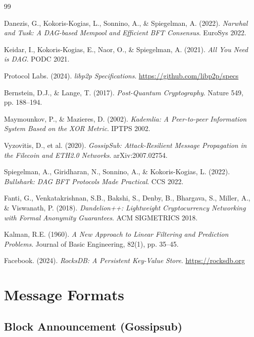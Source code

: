 \documentclass[11pt,a4paper]{article}
\begin{document}
\begin{thebibliography}{99}

Danezis, G., Kokoris-Kogias, L., Sonnino, A., \& Spiegelman, A. (2022).
\textit{Narwhal and Tusk: A DAG-based Mempool and Efficient BFT Consensus}.
EuroSys 2022.

Keidar, I., Kokoris-Kogias, E., Naor, O., \& Spiegelman, A. (2021).
\textit{All You Need is DAG}.
PODC 2021.

Protocol Labs. (2024).
\textit{libp2p Specifications}.
\url{https://github.com/libp2p/specs}

Bernstein, D.J., \& Lange, T. (2017).
\textit{Post-Quantum Cryptography}.
Nature 549, pp. 188--194.

Maymounkov, P., \& Mazieres, D. (2002).
\textit{Kademlia: A Peer-to-peer Information System Based on the XOR Metric}.
IPTPS 2002.

Vyzovitis, D., et al. (2020).
\textit{GossipSub: Attack-Resilient Message Propagation in the Filecoin and ETH2.0 Networks}.
arXiv:2007.02754.

Spiegelman, A., Giridharan, N., Sonnino, A., \& Kokoris-Kogias, L. (2022).
\textit{Bullshark: DAG BFT Protocols Made Practical}.
CCS 2022.

Fanti, G., Venkatakrishnan, S.B., Bakshi, S., Denby, B., Bhargava, S., Miller, A., \& Viswanath, P. (2018).
\textit{Dandelion++: Lightweight Cryptocurrency Networking with Formal Anonymity Guarantees}.
ACM SIGMETRICS 2018.

Kalman, R.E. (1960).
\textit{A New Approach to Linear Filtering and Prediction Problems}.
Journal of Basic Engineering, 82(1), pp. 35--45.

Facebook. (2024).
\textit{RocksDB: A Persistent Key-Value Store}.
\url{https://rocksdb.org}

\end{thebibliography}

\appendix
\section{Message Formats}

\subsection{Block Announcement (Gossipsub)}
\end{document}
